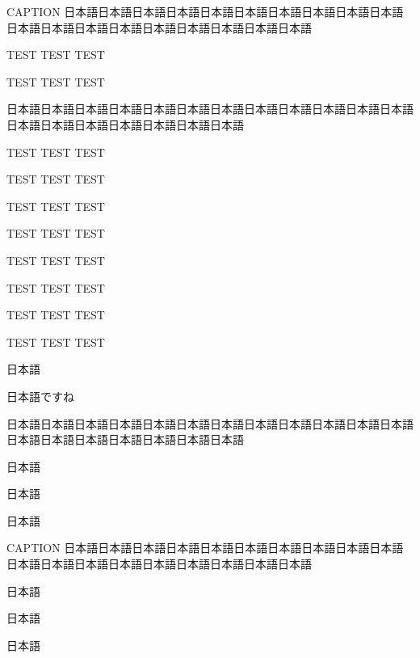 \clearpage

\begin{rv@dottedbox@caption}{CAPTION}
日本語日本語日本語日本語日本語日本語日本語日本語日本語日本語日本語日本語日本語日本語日本語日本語日本語日本語日本語

TEST TEST TEST

TEST TEST TEST

\end{rv@dottedbox@caption}

\begin{rv@dottedbox@nocaption}
日本語日本語日本語日本語日本語日本語日本語日本語日本語日本語日本語日本語日本語日本語日本語日本語日本語日本語日本語

TEST TEST TEST

TEST TEST TEST

TEST TEST TEST

TEST TEST TEST

TEST TEST TEST

TEST TEST TEST

TEST TEST TEST

TEST TEST TEST

日本語

日本語ですね

\end{rv@dottedbox@nocaption}

\clearpage

\begin{rv@sidelinebox@nocaption}
日本語日本語日本語日本語日本語日本語日本語日本語日本語日本語日本語日本語日本語日本語日本語日本語日本語日本語日本語

日本語

日本語

日本語
\end{rv@sidelinebox@nocaption}

\begin{rv@sidelinebox@caption}{CAPTION}
日本語日本語日本語日本語日本語日本語日本語日本語日本語日本語日本語日本語日本語日本語日本語日本語日本語日本語日本語

日本語

日本語

日本語
\end{rv@sidelinebox@caption}

\endinput

simplesquarebox

\begin{simplesquarebox}{CAPTION}

TEST, TEST, TEST

\end{simplesquarebox}

